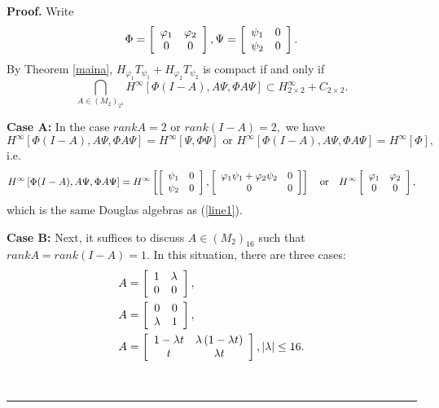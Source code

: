 \documentclass[10pt,a4paper]{amsart}
\newenvironment{proof}[1][Proof]{\noindent\textbf{#1.} }{\ \rule{0.5em}{0.5em}}
\begin{document}
\begin{proof}
Write
\begin{align}
\Phi=\left[
\begin{array}
[c]{cc}%
\varphi_{1} & \varphi_{2}\\
0 & 0
\end{array}
\right]  ,\Psi=\left[
\begin{array}
[c]{cc}%
\psi_{1} & 0\\
\psi_{2} & 0
\end{array}
\right]  .\nonumber
\end{align}
By Theorem \ref{maina}, $H_{\varphi_{1}}T_{\psi_{1}}+H_{\varphi_{2}}%
T_{\psi_{2}}$ is compact if and only if
\[
\bigcap_{A\in\left(  M_{2}\right)  _{2^{4}}}H^{\infty}\left[  \Phi
(I-A),A\Psi,\Phi A\Psi\right]  \subset H^{\infty}_{2\times2}+C_{2\times2}.
\]


\textbf{{Case A:}} In the case $rankA=2$ or $rank(I-A)=2,$ we have%
\[
H^{\infty}\left[  \Phi(I-A),A\Psi,\Phi A\Psi\right]  = H^{\infty}\left[
\Psi,\Phi\Psi\right]  \text{ or }H^{\infty}\left[  \Phi(I-A),A\Psi,\Phi
A\Psi\right]  =H^{\infty}\left[  \Phi\right]  ,
\]
i.e.
\[
H^{\infty}\left[  \Phi(I-A),A\Psi,\Phi A\Psi\right]  =H^{\infty}\left[
\left[
\begin{array}
[c]{cc}%
\psi_{1} & 0\\
\psi_{2} & 0
\end{array}
\right]  , \left[
\begin{array}
[c]{cc}%
\varphi_{1}\psi_{1}+\varphi_{2}\psi_{2} & 0\\
0 & 0
\end{array}
\right]  \right]  \quad\text{or}\quad H^{\infty} \left[
\begin{array}
[c]{cc}%
\varphi_{1} & \varphi_{2}\\
0 & 0
\end{array}
\right]  ,
\]
which is the same Douglas algebras as (\ref{line1}).

\textbf{{Case B:}} Next, it suffices to discuss $A\in\left(  M_{2}\right)
_{16}$ such that $rankA=rank(I-A)=1.$ In this situation, there are three
cases:%
\begin{align}
A  &  =\left[
\begin{array}
[c]{cc}%
1 & \lambda\\
0 & 0
\end{array}
\right]  ,\label{line1a}\\
A  &  =\left[
\begin{array}
[c]{cc}%
0 & 0\\
\lambda & 1
\end{array}
\right]  ,\label{line2a}\\
A  &  =\left[
\begin{array}
[c]{cc}%
1-\lambda t & \lambda\left(  1-\lambda t\right) \\
t & \lambda t
\end{array}
\right]  ,\left\vert \lambda\right\vert \leq16. \label{line3a}%
\end{align}



\end{proof}
\end{document}
